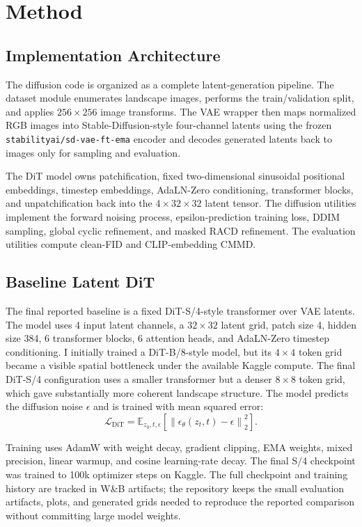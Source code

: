 \documentclass{article}
\begin{document}
\section{Method}

\subsection{Implementation Architecture}

The diffusion code is organized as a complete latent-generation pipeline. The
dataset module enumerates landscape images, performs the train/validation split,
and applies $256 \times 256$ image transforms. The VAE wrapper then maps
normalized RGB images into Stable-Diffusion-style four-channel latents using
the frozen \texttt{stabilityai/sd-vae-ft-ema} encoder and decodes generated
latents back to images only for sampling and evaluation.

The DiT model owns patchification, fixed two-dimensional sinusoidal positional
embeddings, timestep embeddings, AdaLN-Zero conditioning, transformer blocks,
and unpatchification back into the $4 \times 32 \times 32$ latent tensor. The
diffusion utilities implement the forward noising process, epsilon-prediction
training loss, DDIM sampling, global cyclic refinement, and masked RACD
refinement. The evaluation utilities compute clean-FID and CLIP-embedding CMMD.

\subsection{Baseline Latent DiT}

The final reported baseline is a fixed DiT-S/4-style transformer over VAE
latents. The model uses 4 input latent channels, a $32 \times 32$ latent grid,
patch size 4, hidden size 384, 6 transformer blocks, 6 attention heads, and
AdaLN-Zero timestep conditioning. I initially trained a DiT-B/8-style model,
but its $4 \times 4$ token grid became a visible spatial bottleneck under the
available Kaggle compute. The final DiT-S/4 configuration uses a smaller
transformer but a denser $8 \times 8$ token grid, which gave substantially
more coherent landscape structure. The model predicts the diffusion noise
$\epsilon$ and is trained with mean squared error:
\[
  \mathcal{L}_{\mathrm{DiT}} =
  \mathbb{E}_{z_0, t, \epsilon}
  \left[
    \left\| \epsilon_\theta(z_t, t) - \epsilon \right\|_2^2
  \right].
\]

Training uses AdamW with weight decay, gradient clipping, EMA weights, mixed
precision, linear warmup, and cosine learning-rate decay. The final S/4
checkpoint was trained to 100k optimizer steps on Kaggle. The full checkpoint
and training history are tracked in W\&B artifacts; the repository keeps the
small evaluation artifacts, plots, and generated grids needed to reproduce the
reported comparison without committing large model weights.
\end{document}
